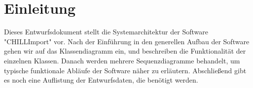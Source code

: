 \section{Einleitung}

Dieses Entwurfsdokument stellt die Systemarchitektur der Software \string"CHILLImport\string" vor.
Nach der Einführung in den generellen Aufbau der Software gehen wir auf das Klassendiagramm ein, und beschreiben die Funktionalität der einzelnen Klassen.
Danach werden mehrere Sequenzdiagramme behandelt, um typische funktionale Abläufe der Software näher zu erläutern.
Abschließend gibt es noch eine Auflistung der Entwurfsdaten, die benötigt werden.
